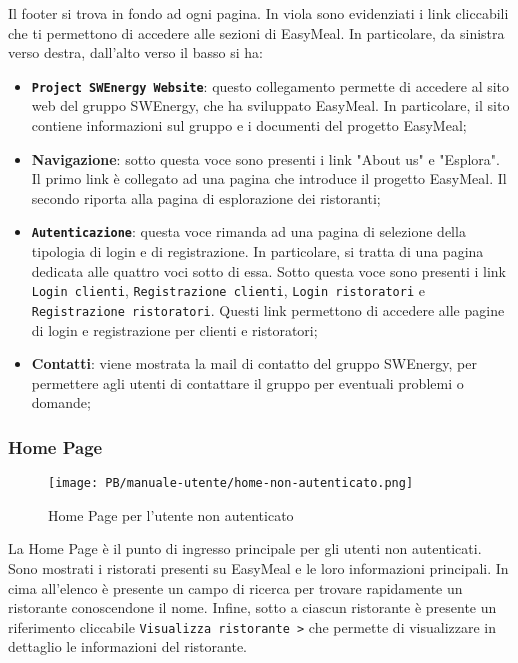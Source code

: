 Il footer si trova in fondo ad ogni pagina. In viola sono evidenziati i link
cliccabili che ti permettono di accedere alle sezioni di EasyMeal. In
particolare, da sinistra verso destra, dall'alto verso il basso si ha:
\begin{itemize}
	\item \textbf{\texttt{Project SWEnergy Website}}: questo collegamento permette di
		accedere al sito web del gruppo SWEnergy, che ha sviluppato EasyMeal.
		In particolare, il sito contiene informazioni sul gruppo e i documenti
		del progetto EasyMeal;

	\item \textbf{Navigazione}: sotto questa voce sono presenti i link "About
		us" e "Esplora". Il primo link è collegato ad una pagina che introduce
		il progetto EasyMeal. Il secondo riporta alla pagina di esplorazione dei
		ristoranti;

	\item \textbf{\texttt{Autenticazione}}: questa voce rimanda ad una pagina di
		selezione della tipologia di login e di registrazione. In particolare,
		si tratta di una pagina dedicata alle quattro voci sotto di essa. Sotto
		questa voce sono presenti i link \texttt{Login clienti}, 
		\texttt{Registrazione clienti}, \texttt{Login ristoratori} e 
		\texttt{Registrazione ristoratori}. Questi
		link permettono di accedere alle pagine di login e registrazione per
		clienti e ristoratori;

	\item \textbf{Contatti}: viene mostrata la mail di contatto del gruppo
		SWEnergy, per permettere agli utenti di contattare il gruppo per
		eventuali problemi o domande;
\end{itemize}


\subsubsection{Home Page}

\begin{figure}[htbp]
    \centering
	\texttt{[image: PB/manuale-utente/home-non-autenticato.png]}
    \caption{Home Page per l'utente non autenticato}
\end{figure}

La Home Page è il punto di ingresso principale per gli utenti non autenticati. 
Sono mostrati i ristorati presenti su EasyMeal e le loro informazioni
principali. In cima all'elenco è presente un campo di ricerca per trovare
rapidamente un ristorante conoscendone il nome. Infine, sotto a ciascun
ristorante è presente un riferimento cliccabile \texttt{Visualizza ristorante >}
che permette di visualizzare in dettaglio le informazioni del ristorante.

